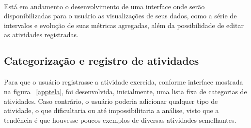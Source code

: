             \paragraph{} Está em andamento o desenvolvimento de uma interface onde serão disponibilizadas para o usuário as visualizações de seus dados, como a série de intervalos e evolução de suas métricas agregadas, além da possibilidade de editar as atividades registradas.
        
        \subsection{Categorização e registro de atividades} \label{categories}
    
            \paragraph{} Para que o usuário registrasse a atividade exercida, conforme interface mostrada na figura ~\ref{apptela}, foi desenvolvida, inicialmente, uma lista fixa de categorias de atividades. Caso contrário, o usuário poderia adicionar qualquer tipo de atividade, o que dificultaria ou até impossibilitaria a análise, visto que a tendência é que houvesse poucos exemplos de diversas atividades semelhantes. 
            

